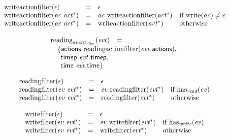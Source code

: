 $$
\begin{array}[t]{@{}lcl@{}l@{}}
{\mathrm{writeactionfilter}}(\epsilon) & = & \epsilon \\
{\mathrm{writeactionfilter}}({\mathit{ac}}~{{\mathit{act}}^\ast}) & = & {\mathit{ac}}~{\mathrm{writeactionfilter}}({{\mathit{act}}^\ast}) & \quad \mbox{if}~ {\mathrm{write}}({\mathit{ac}}) \neq \epsilon \\
{\mathrm{writeactionfilter}}({\mathit{ac}}~{{\mathit{act}}^\ast}) & = & {\mathrm{writeactionfilter}}({{\mathit{act}}^\ast}) & \quad \mbox{otherwise} \\
\end{array}
$$

$$
\begin{array}[t]{@{}lcl@{}l@{}}
{\mathrm{reading}}_{{\mathit{event}}_{\mathit{filter}}}({\mathit{evt}}) & = & & \\
 \multicolumn{4}{@{}l@{}}{\quad
\begin{array}[t]{@{}l@{}}
\{ \begin{array}[t]{@{}l@{}}
\mathsf{actions}~{\mathrm{readingactionfilter}}({\mathit{evt}}{.}\mathsf{actions}),\; \\
  \mathsf{timep}~{\mathit{evt}}{.}\mathsf{timep},\; \\
  \mathsf{time}~{\mathit{evt}}{.}\mathsf{time} \}\end{array} \\
\end{array}
} \\
\end{array}
$$

$$
\begin{array}[t]{@{}lcl@{}l@{}}
{\mathrm{readingfilter}}(\epsilon) & = & \epsilon \\
{\mathrm{readingfilter}}({\mathit{ev}}~{{\mathit{evt}}^\ast}) & = & {\mathit{ev}}~{\mathrm{readingfilter}}({{\mathit{evt}}^\ast}) & \quad \mbox{if}~ {\mathrm{has}}_{\mathit{read}}({\mathit{ev}}) \\
{\mathrm{readingfilter}}({\mathit{ev}}~{{\mathit{evt}}^\ast}) & = & {\mathrm{readingfilter}}({{\mathit{evt}}^\ast}) & \quad \mbox{otherwise} \\
\end{array}
$$

$$
\begin{array}[t]{@{}lcl@{}l@{}}
{\mathrm{writefilter}}(\epsilon) & = & \epsilon \\
{\mathrm{writefilter}}({\mathit{ev}}~{{\mathit{evt}}^\ast}) & = & {\mathit{ev}}~{\mathrm{writefilter}}({{\mathit{evt}}^\ast}) & \quad \mbox{if}~ {\mathrm{has}}_{\mathit{write}}({\mathit{ev}}) \\
{\mathrm{writefilter}}({\mathit{ev}}~{{\mathit{evt}}^\ast}) & = & {\mathrm{writefilter}}({{\mathit{evt}}^\ast}) & \quad \mbox{otherwise} \\
\end{array}
$$

